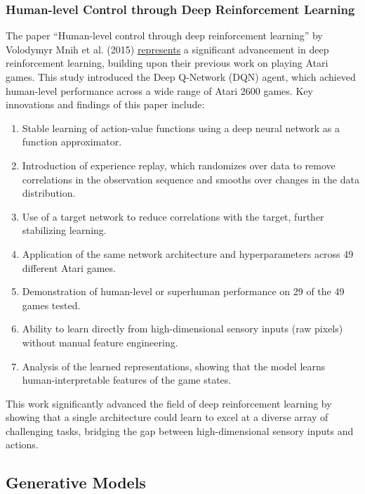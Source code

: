 \documentclass{article}
\begin{document}
\subsubsection*{Human-level Control through Deep Reinforcement Learning}

The paper ``Human-level control through deep reinforcement learning'' by Volodymyr Mnih et al. (2015) \href{https://www.semanticscholar.org/paper/Human-level-control-through-deep-reinforcement-Mnih-Kavukcuoglu/340f48901f72278f6bf78a04ee5b01df208cc508}{represents} a significant advancement in deep reinforcement learning, building upon their previous work on playing Atari games.\cite{Mnih2015} This study introduced the Deep Q-Network (DQN) agent, which achieved human-level performance across a wide range of Atari 2600 games.
Key innovations and findings of this paper include:
\begin{enumerate}
    \item Stable learning of action-value functions using a deep neural network as a function approximator.
    \item Introduction of experience replay, which randomizes over data to remove correlations in the observation sequence and smooths over changes in the data distribution.
    \item Use of a target network to reduce correlations with the target, further stabilizing learning.
    \item Application of the same network architecture and hyperparameters across 49 different Atari games.
    \item Demonstration of human-level or superhuman performance on 29 of the 49 games tested.
    \item Ability to learn directly from high-dimensional sensory inputs (raw pixels) without manual feature engineering.
    \item Analysis of the learned representations, showing that the model learns human-interpretable features of the game states.
\end{enumerate}

This work significantly advanced the field of deep reinforcement learning by showing that a single architecture could learn to excel at a diverse array of challenging tasks, bridging the gap between high-dimensional sensory inputs and actions.

\subsection{Generative Models}
\end{document}
